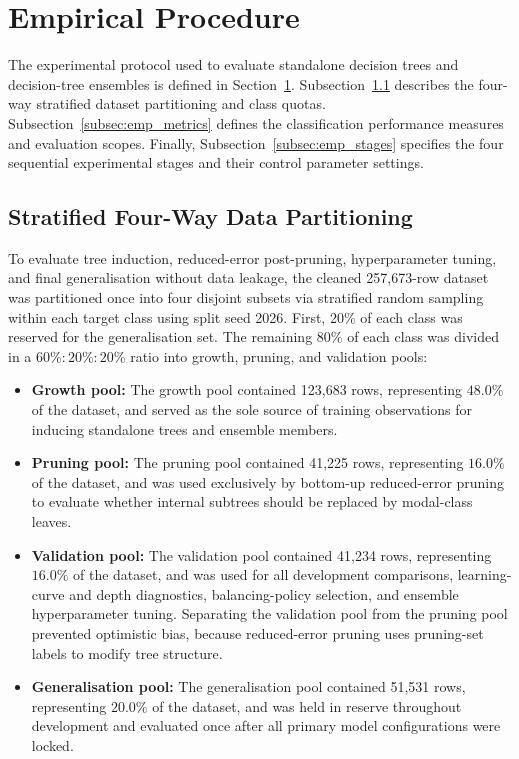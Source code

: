 \section{Empirical Procedure}
\label{sec:empirics}

The experimental protocol used to evaluate standalone decision trees and decision-tree ensembles is defined in Section~\ref{sec:empirics}. Subsection~\ref{subsec:emp_split} describes the four-way stratified dataset partitioning and class quotas. Subsection~\ref{subsec:emp_metrics} defines the classification performance measures and evaluation scopes. Finally, Subsection~\ref{subsec:emp_stages} specifies the four sequential experimental stages and their control parameter settings.

\subsection{Stratified Four-Way Data Partitioning}
\label{subsec:emp_split}
To evaluate tree induction, reduced-error post-pruning, hyperparameter tuning, and final generalisation without data leakage, the cleaned 257,673-row dataset was partitioned once into four disjoint subsets via stratified random sampling within each target class using split seed 2026. First, $20\%$ of each class was reserved for the generalisation set. The remaining $80\%$ of each class was divided in a $60\% : 20\% : 20\%$ ratio into growth, pruning, and validation pools:
\begin{itemize}
    \item \textbf{Growth pool:} The growth pool contained 123,683 rows, representing $48.0\%$ of the dataset, and served as the sole source of training observations for inducing standalone trees and ensemble members.
    \item \textbf{Pruning pool:} The pruning pool contained 41,225 rows, representing $16.0\%$ of the dataset, and was used exclusively by bottom-up reduced-error pruning to evaluate whether internal subtrees should be replaced by modal-class leaves.
    \item \textbf{Validation pool:} The validation pool contained 41,234 rows, representing $16.0\%$ of the dataset, and was used for all development comparisons, learning-curve and depth diagnostics, balancing-policy selection, and ensemble hyperparameter tuning. Separating the validation pool from the pruning pool prevented optimistic bias, because reduced-error pruning uses pruning-set labels to modify tree structure.
    \item \textbf{Generalisation pool:} The generalisation pool contained 51,531 rows, representing $20.0\%$ of the dataset, and was held in reserve throughout development and evaluated once after all primary model configurations were locked.
\end{itemize}

